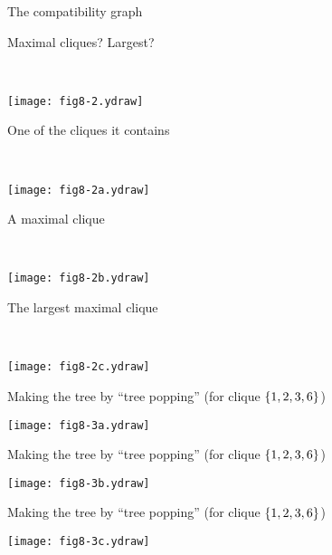 \documentclass[bluish,slideColor,colorBG,pdf]{prosper}
\begin{document}
\begin{slide}[Replace]{The compatibility graph}

\centerline{Maximal cliques?  Largest?}
{~~}
\bigskip

\centerline{\texttt{[image: fig8-2.ydraw]}}

\end{slide}

\begin{slide}[Replace]{One of the cliques it contains}

{~~}
\vspace{0.24in}
\bigskip

\centerline{\texttt{[image: fig8-2a.ydraw]}}

\end{slide}

\begin{slide}[Replace]{A maximal clique}

{~~}
\vspace{0.24in}
\bigskip

\centerline{\texttt{[image: fig8-2b.ydraw]}}

\end{slide}

\begin{slide}[Replace]{The largest maximal clique}

{~~}
\vspace{0.24in}
\bigskip

\centerline{\texttt{[image: fig8-2c.ydraw]}}

\end{slide}

\begin{slide}[Replace]{Making the tree by ``tree popping'' }
(for clique $\mathsf\{1, 2, 3, 6\}$)

\centerline{\texttt{[image: fig8-3a.ydraw]}}

\end{slide}

\begin{slide}[Replace]{Making the tree by ``tree popping'' }
(for clique $\mathsf\{1, 2, 3, 6\}$)

\centerline{\texttt{[image: fig8-3b.ydraw]}}

\end{slide}

\begin{slide}[Replace]{Making the tree by ``tree popping'' }
(for clique $\mathsf\{1, 2, 3, 6\}$)

\centerline{\texttt{[image: fig8-3c.ydraw]}}

\end{slide}
\end{document}
